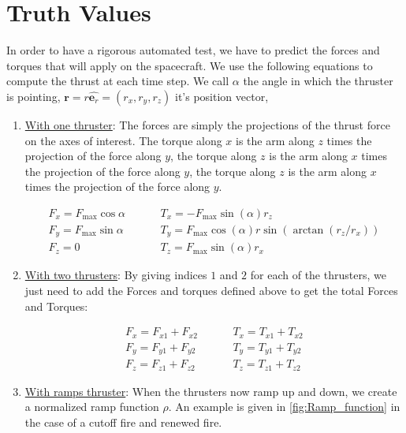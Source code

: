 \documentclass[]{BasiliskReportMemo}
\begin{document}
\section{Truth Values}

In order to have a rigorous automated test, we have to predict the forces and torques that will apply on the spacecraft. We use the following equations to compute the thrust at each time step. We call $\alpha$ the angle in which the thruster is pointing, $\bm r = r \hat{\bm e_r}= \left(r_x, r_y, r_z \right)$ it's position vector, 

\begin{enumerate}
\item{\underline{With one thruster}}: The forces are simply the projections of the thrust force on the axes of interest. The torque along $x$ is the arm along $z$ times the projection of the force along $y$, the torque along $z$ is the arm along $x$ times the projection of the force along $y$, the torque along $z$ is the arm along $x$ times the projection of the force along $y$. 

\begin{align}
F_x =F_{\mathrm{max}} \cos \alpha &\hspace{1cm} T_x = - F_{\mathrm{max}}\sin(\alpha) r_z \\ 
F_y = F_{\mathrm{max}} \sin \alpha &\hspace{1cm} T_y = F_{\mathrm{max}} \cos(\alpha) r \sin( \arctan(r_z/r_x)) \\ 
F_z = 0 &\hspace{1cm} T_z =  F_{\mathrm{max}} \sin(\alpha) r_x 
\end{align}


\item{\underline{With two thrusters}}: By giving indices $1$ and $2$ for each of the thrusters, we just need to add the Forces and torques defined above to get the total Forces and Torques:

\begin{align}
F_x = F_{x1} + F_{x2} &\hspace{1cm} T_x = T_{x1} + T_{x2} \\ 
F_y =  F_{y1} + F_{y2} &\hspace{1cm} T_y =  T_{y1} + T_{y2}\\ 
F_z =  F_{z1} + F_{z2} &\hspace{1cm} T_z =  T_{z1} + T_{z2}
\end{align}

\item{\underline{With ramps thruster}}: When the thrusters now ramp up and down, we create a normalized ramp function $\rho$. An example is given in \ref{fig:Ramp_function} in the case of a cutoff fire and renewed fire. \par


\end{enumerate}
\end{document}
